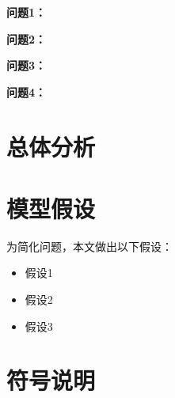 \documentclass[withoutpreface,bwprint]{cumcmthesis}
\begin{document}
\textbf{问题1：}  

\textbf{问题2：}  

\textbf{问题3：} 

\textbf{问题4：}  

















\newpage
\section{总体分析}
























\newpage
\section{模型假设}

为简化问题，本文做出以下假设：

\begin{itemize}[itemindent=2em]
\item 假设1
\item 假设2
\item 假设3
\end{itemize}


\section{符号说明}
\end{document}
